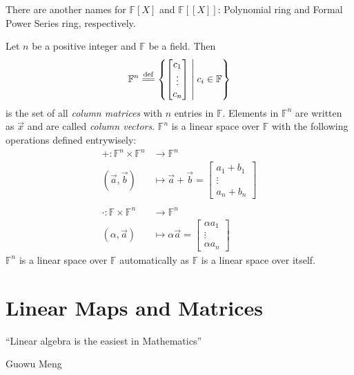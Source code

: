 \documentclass[
	11pt, %
	fleqn, %
	a4paper, %
]{LegrandOrangeBook}
\newcommand{\F}{\mathbb{F}} %
\begin{document}
There are another names for $\F[X]$ and $\F[[X]]$: Polynomial ring and Formal Power Series ring, respectively.

\begin{example}
    Let $n$ be a positive integer and $\F$ be a field. Then 
    \[
        \F^n \overset{\mathrm{def}}{=\joinrel=} \left\{ 
        \begin{bmatrix}
        c_1 \\
        \vdots \\
        c_n
        \end{bmatrix}
        \;\middle|\; c_i \in \F
        \right\}
    \]
    is the set of all \emph{column matrices} with $n$ entries in $\F$. Elements in $\F^n$ are written as $\vec{x}$ and are called \emph{column vectors}. $\F^n$ is a linear space over $\F$ with the following operations defined entrywisely:
    \[
        \begin{split}
            + : \F^n \times \F^n &\to \F^n \\
            (\vec{a}, \vec{b}) &\mapsto \vec{a} + \vec{b} = \begin{bmatrix}
            a_1 + b_1 \\
            \vdots \\
            a_n + b_n
            \end{bmatrix} \\ \\
            \cdot : \F \times \F^n &\to \F^n \\
            (\alpha, \vec{a}) &\mapsto \alpha \vec{a} = \begin{bmatrix}
            \alpha a_1 \\
            \vdots \\
            \alpha a_n
            \end{bmatrix}
        \end{split}
    \]
    $\F^n$ is a linear space over $\F$ automatically as $\F$ is a linear space over itself.
\end{example}


\chapter{Linear Maps and Matrices}

\epigraph{``Linear algebra is the easiest in Mathematics''}{Guowu Meng}
\end{document}
